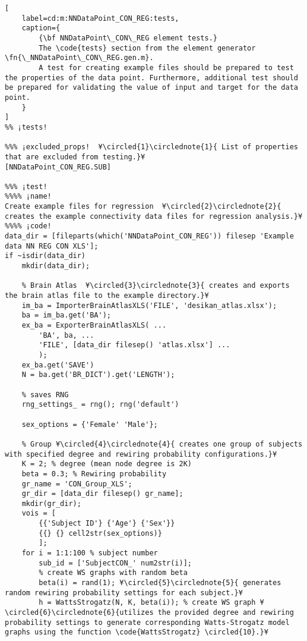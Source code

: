 \documentclass{tufte-handout}
\begin{document}
\begin{lstlisting}[
	label=cd:m:NNDataPoint_CON_REG:tests,
	caption={
		{\bf NNDataPoint\_CON\_REG element tests.}
		The \code{tests} section from the element generator \fn{\_NNDataPoint\_CON\_REG.gen.m}.
		A test for creating example files should be prepared to test the properties of the data point. Furthermore, additional test should be prepared for validating the value of input and target for the data point.
	}
]			
%% ¡tests!

%%% ¡excluded_props!  ¥\circled{1}\circlednote{1}{ List of properties that are excluded from testing.}¥
[NNDataPoint_CON_REG.SUB]

%%% ¡test!
%%%% ¡name!
Create example files for regression  ¥\circled{2}\circlednote{2}{ creates the example connectivity data files for regression analysis.}¥
%%%% ¡code!
data_dir = [fileparts(which('NNDataPoint_CON_REG')) filesep 'Example data NN REG CON XLS'];
if ~isdir(data_dir)
    mkdir(data_dir);

    % Brain Atlas  ¥\circled{3}\circlednote{3}{ creates and exports the brain atlas file to the example directory.}¥
    im_ba = ImporterBrainAtlasXLS('FILE', 'desikan_atlas.xlsx');
    ba = im_ba.get('BA');
    ex_ba = ExporterBrainAtlasXLS( ...
        'BA', ba, ...
        'FILE', [data_dir filesep() 'atlas.xlsx'] ...
        );
    ex_ba.get('SAVE')
    N = ba.get('BR_DICT').get('LENGTH');

    % saves RNG
    rng_settings_ = rng(); rng('default')

    sex_options = {'Female' 'Male'};

    % Group ¥\circled{4}\circlednote{4}{ creates one group of subjects with specified degree and rewiring probability configurations.}¥
    K = 2; % degree (mean node degree is 2K)
    beta = 0.3; % Rewiring probability
    gr_name = 'CON_Group_XLS';
    gr_dir = [data_dir filesep() gr_name];
    mkdir(gr_dir);
    vois = [
        {{'Subject ID'} {'Age'} {'Sex'}}
        {{} {} cell2str(sex_options)}
        ];
    for i = 1:1:100 % subject number
        sub_id = ['SubjectCON_' num2str(i)];
        % create WS graphs with random beta
        beta(i) = rand(1); ¥\circled{5}\circlednote{5}{ generates random rewiring probability settings for each subject.}¥
        h = WattsStrogatz(N, K, beta(i)); % create WS graph ¥\circled{6}\circlednote{6}{utilizes the provided degree and rewiring probability settings to generate corresponding Watts-Strogatz model graphs using the function \code{WattsStrogatz} \circled{10}.}¥


\end{lstlisting}
\end{document}
